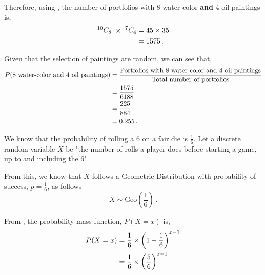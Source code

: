 \begin{subquestions}
\begin{subsubquestions}
Therefore, using , the number of portfolios with 8 water-color \textbf{and} 4 oil paintings is,
\begin{align}
	^{10}C_{8} ~\times ~ ^7C_{4} & = 45 \times 35 \nonumber \\
	                            & = 1575 \,.
\end{align}


\subsubquestion

Given that the selection of paintings are random, we can see that,
\begin{align}
	P(\text{8 water-color and 4 oil paintings}) & = \frac{\text{Portfolios with 8 water-color and 4 oil paintings}}{\text{Total number of portfolios}} \nonumber \\
	                                            & = \frac{1575}{6188} \nonumber \\
	                                            & = \frac{225}{884} \nonumber \\
	                                            & = 0.255 \,.
\end{align}

\end{subsubquestions}
	

\subquestion

We know that the probability of rolling a 6 on a fair die is $\frac{1}{6}$. Let a discrete random variable $X$ be "the number of rolls a player does before starting a game, up to and including the 6".

From this, we know that $X$ follows a Geometric Distribution with probability of success, $p=\frac{1}{6}$, as follows
\begin{equation}
	X \sim \text{Geo} \left(\frac{1}{6} \right) \,.
\end{equation}

\begin{subsubquestions}
	
\subquestion

From , the probability mass function, $P(X=x)$ is,
\begin{align}
	P(X = x) & = \frac{1}{6} \times \left(1-\frac{1}{6} \right)^{x-1} \nonumber \\
	         & = \frac{1}{6} \times \left(\frac{5}{6} \right)^{x-1}
\end{align}
	

\end{subsubquestions}
\end{subquestions}
